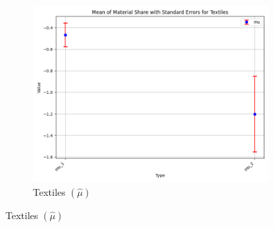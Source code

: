 \documentclass{article}
\begin{document}
\begin{figure}[ht!]
\begin{subfigure}[t]{0.32\textwidth}
        \centering
        \includegraphics[width=\textwidth]{figure/empirical_stat_normal_kmshare_ciiu_mu_with_error_bars_Textiles.png}
        \caption{Textiles $(\hat\mu)$}
    \end{subfigure}


\end{figure}
\end{document}
